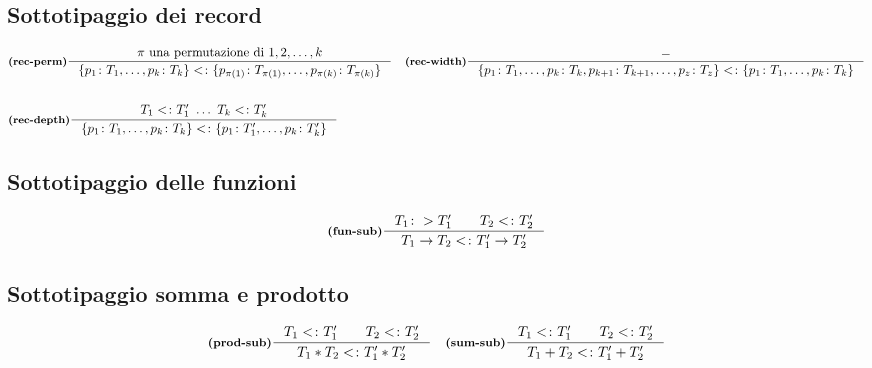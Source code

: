 \documentclass[a4paper, 10pt]{article}
\newcommand{\infer}[4]{\inference[\textbf{#1}]{#2}{#3}#4 }
\begin{document}
\subsection*{Sottotipaggio dei record}
	\begin{align*}
		&\infer{(rec-perm)}{\pi\ \textup{una permutazione di } 1,2,\dots, k}{
			\{p_1\colon T_1, \dots,p_k\colon T_k\}<\colon \{p_{\pi(1)}\colon T_{\pi (1)},\dots, p_{\pi(k)}\colon T_{\pi(k)} \}}{}
		&\infer{(rec-width)}{-}{\{p_1\colon T_1,\dots,p_k\colon T_k, p_{k+1}\colon T_{k+1},\dots, p_z\colon T_z \} <\colon \{p_1\colon T_1,\dots, p_k\colon T_k \}}{} \\ \\
		&\infer{(rec-depth)}{T_1<\colon T_1'\ \dots\ T_k<\colon T_k'}{\{ p_1\colon T_1,\dots , p_k\colon T_k \} <\colon \{ p_1\colon T_1',\dots,p_k\colon T_k'\}}{}
	\end{align*}
	
\subsection*{Sottotipaggio delle funzioni}
	\begin{minipage}{.45\linewidth}
		\begin{flushleft} 
			\[
				\infer{(fun-sub)}{T_1\colon> T_1'\qquad T_2<\colon T_2'}{T_1\rightarrow T_2 <\colon T_1'\rightarrow T_2'}{}
			\]
		\end{flushleft}
	\end{minipage}
\subsection*{Sottotipaggio somma e prodotto}
	\begin{align*}
		&\infer{(prod-sub)}{T_1<\colon T_1'\qquad T_2<\colon T_2'}{T_1 \ast T_2 <\colon T_1'\ast T_2'}{} 
		&\infer{(sum-sub)}{T_1<\colon T_1'\qquad T_2<\colon T_2'}{T_1 + T_2 <\colon T_1'+ T_2'}{}
	\end{align*}
	
\end{document}
